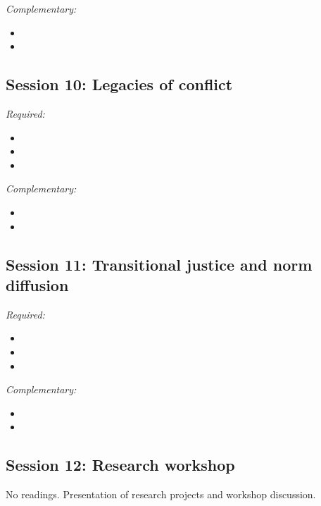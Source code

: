 \documentclass[12pt, a4paper]{article}
\begin{document}
\noindent\textit{Complementary:}

\begin{itemize}
  \item
  \item
\end{itemize}

\hline
\subsection*{Session 10: Legacies of conflict}

\noindent\textit{Required:}

\begin{itemize}
  \item
  \item
  \item
\end{itemize}

\noindent\textit{Complementary:}

\begin{itemize}
  \item
  \item
\end{itemize}

\hline
\subsection*{Session 11: Transitional justice and norm diffusion}

\noindent\textit{Required:}

\begin{itemize}
  \item
  \item
  \item
\end{itemize}

\noindent\textit{Complementary:}

\begin{itemize}
  \item
  \item
\end{itemize}

\hline
\subsection*{Session 12: Research workshop}

No readings. Presentation of research projects and workshop discussion.
\end{document}
